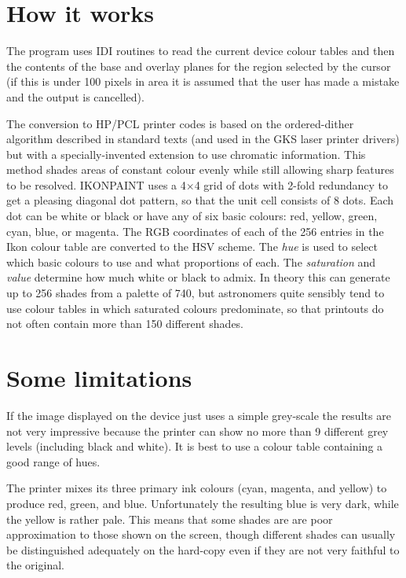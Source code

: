 \section{How it works} 

The program uses IDI routines
to read the current device colour tables and then the contents
of the base and overlay planes for the region selected by the cursor (if
this is under 100 pixels in area it is assumed that the user has made a
mistake and the output is cancelled).

The conversion to HP/PCL printer codes is based on the ordered-dither
algorithm described in standard texts (and used in the GKS laser printer
drivers) but with a specially-invented extension to use chromatic
information. This method shades areas of constant colour evenly while
still allowing sharp features to be resolved. IKONPAINT uses a
4$\times$4 grid of dots with 2-fold redundancy to get a pleasing
diagonal dot pattern, so that the unit cell consists of 8 dots.  Each
dot can be white or black or have any of six basic colours: red, yellow,
green, cyan, blue, or magenta. The RGB coordinates of each of the 256
entries in the Ikon colour table are converted to the HSV scheme.  The
{\it hue} is used to select which basic colours to use and what
proportions of each.  The {\it saturation} and {\it value} determine how
much white or black to admix. In theory this can generate up to 256
shades from a palette of 740, but astronomers quite sensibly tend to use
colour tables in which saturated colours predominate, so that printouts
do not often contain more than 150 different shades. 

\section{Some limitations} 

If the image displayed on the device just uses a simple grey-scale
the results are not very impressive because the printer can show no more
than 9 different grey levels (including black and white).  It is best to
use a colour table containing a good range of hues. 

The printer mixes its three primary ink colours (cyan, magenta, and
yellow) to produce red, green, and blue.  Unfortunately the resulting
blue is very dark, while the yellow is rather pale. This means that some
shades are are poor approximation to those shown on the screen,
though different shades can usually be distinguished adequately on the
hard-copy even if they are not very faithful to the original. 

